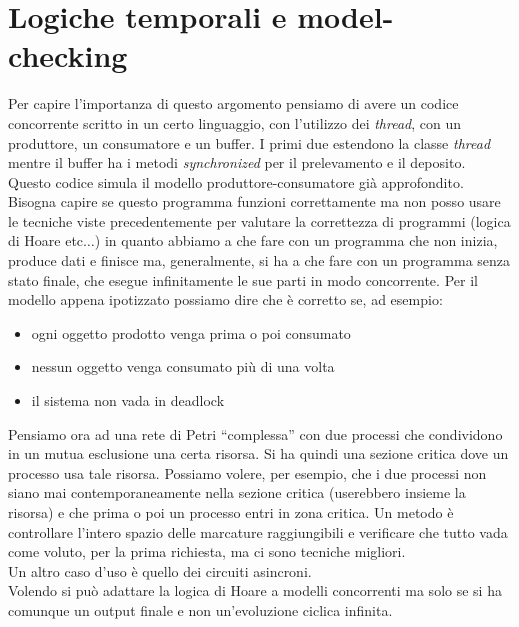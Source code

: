 
\chapter{Logiche temporali e model-checking}
\label{Capitolo 6}
Per capire l'importanza di questo argomento pensiamo di avere un codice
concorrente scritto in un certo linguaggio, con l'utilizzo dei \textit{thread},
con un produttore, un consumatore e un buffer. I primi due estendono la classe
\textit{thread} mentre il buffer ha i metodi \textit{synchronized} per il
prelevamento e il deposito. Questo codice simula il modello
produttore-consumatore già approfondito. Bisogna capire se questo programma
funzioni correttamente ma non posso usare le tecniche viste precedentemente per
valutare la correttezza di programmi (logica di Hoare etc$\ldots$) in quanto
abbiamo a che fare con un programma che non inizia, produce dati e finisce ma,
generalmente, si ha a che fare con un programma senza stato finale, che esegue
infinitamente le sue parti in modo concorrente. Per il modello appena ipotizzato
possiamo dire che è corretto se, ad esempio:
\begin{itemize}
  \item ogni oggetto prodotto venga prima o poi consumato
  \item nessun oggetto venga consumato più di una volta
  \item il sistema non vada in deadlock
\end{itemize}
Pensiamo ora ad una rete di Petri ``complessa'' con due processi che
condividono in un mutua esclusione una certa risorsa. Si ha quindi una sezione
critica dove un processo usa tale risorsa. Possiamo volere, per esempio, che i
due processi non siano mai contemporaneamente nella sezione critica (userebbero
insieme la risorsa) e che prima o poi un processo entri in zona critica. Un
metodo è controllare l'intero spazio delle marcature raggiungibili e verificare
che tutto vada come voluto, per la prima richiesta, ma ci sono tecniche
migliori.  \\
Un altro caso d'uso è quello dei circuiti asincroni.\\
Volendo si può adattare la logica di Hoare a modelli concorrenti ma solo se si
ha comunque un output finale e non un'evoluzione ciclica infinita.
